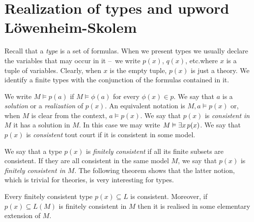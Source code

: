 \documentclass[creche.tex]{subfiles}
\begin{document}
% 
% 



\section{Realization of types and upword L\"owenheim-Skolem}

\def\ceq#1#2#3{\parbox{13ex}{$\displaystyle #1$}\parbox{4ex}{\hfil$#2$}$\displaystyle #3$}
 
Recall that a \emph{type\/} is a set of formulas. When we present types we usually declare the variables that may occur in it --~we write \emph{$p(x)$}, \emph{$q(x)$}, etc.\@ where $x$ is a tuple of variables. Clearly, when $x$ is the empty tuple, $p(x)$ is just a theory. We identify a finite types with the conjunction of the formulas contained in it.

We write \emph{$M\models p(a)$} if $M\models\phi(a)$ for every $\phi(x)\in p$.  We say that $a$ is a \emph{solution\/} or a \emph{realization\/} of $p(x)$. An equivalent notation is \emph{$M,a\models p(x)$} or, when $M$ is clear from the context, \emph{$a\models p(x)$}. We say that $p(x)$ is \emph{consistent in $M$\/} it has a solution in $M$. In this case we may write \emph{$M\vDash\exists x\,p(x)$}.  We say that $p(x)$ is \emph{consistent\/} tout court if it is consistent in some model.

We say that a type $p(x)$ is \emph{finitely consistent\/} if all its finite subsets are consistent. If they are all consistent in the same model $M$, we say that $p(x)$ is \emph{finitely consistent in $M$}. The following theorem shows that the latter notion, which is trivial for theories, is very interesting for types.

\begin{void_thm}\label{thm_compattezzatipi}
Every finitely consistent type $p(x)\subseteq L$ is consistent. Moreover, if $p(x)\subseteq L(M)$ is finitely consistent in $M$ then it is realised in some elementary extension of $M$.
\end{void_thm}
\end{document}
